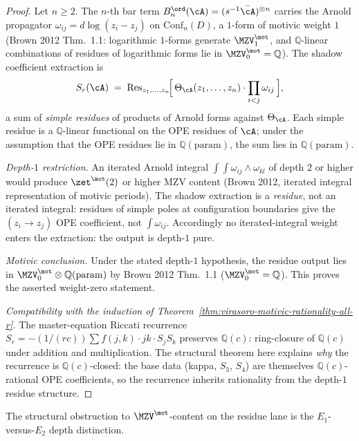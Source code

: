 \begin{proof}
Let $n \geq 2$. The $n$-th bar term
$B_n^{\ord}(\cA) = (s^{-1} \bar{\cA})^{\otimes n}$ carries the Arnold
propagator $\omega_{ij} = d\log(z_i - z_j)$ on $\mathrm{Conf}_n(D)$,
a $1$-form of motivic weight $1$ (Brown 2012 Thm.\ 1.1: logarithmic
$1$-forms generate $\MZV^{\mot}_1$, and $\mathbb{Q}$-linear
combinations of residues of logarithmic forms lie in $\MZV^{\mot}_0 =
\mathbb{Q}$). The shadow coefficient extraction is
\[
 S_r(\cA) \;=\; \operatorname{Res}_{z_1, \ldots, z_n}\!
 \Bigl[\,
 \Theta_{\cA}(z_1, \ldots, z_n) \cdot \prod_{i < j} \omega_{ij}
 \,\Bigr],
\]
a sum of \emph{simple residues} of products of Arnold forms against
$\Theta_{\cA}$. Each simple residue is a $\mathbb{Q}$-linear functional
on the OPE residues of $\cA$; under the assumption that the OPE
residues lie in $\mathbb{Q}(\mathrm{param})$, the sum lies in
$\mathbb{Q}(\mathrm{param})$.

\emph{Depth-$1$ restriction.} An iterated Arnold integral
$\int\!\int \omega_{ij} \wedge \omega_{kl}$ of depth $2$ or higher
would produce $\zet^{\mot}(2)$ or higher MZV content (Brown 2012,
iterated integral representation of motivic periods). The shadow
extraction is a \emph{residue}, not an iterated integral: residues
of simple poles at configuration boundaries give the
$(z_i \to z_j)$ OPE coefficient, not $\int \omega_{ij}$. Accordingly
no iterated-integral weight enters the extraction: the output is
depth-$1$ pure.

\emph{Motivic conclusion.} Under the stated depth-$1$ hypothesis, the
residue output lies in
$\MZV^{\mot}_0 \otimes \mathbb{Q}(\mathrm{param})$ by Brown 2012
Thm.\ 1.1 ($\MZV^{\mot}_0 = \mathbb{Q}$). This proves the asserted
weight-zero statement.

\emph{Compatibility with the induction of
Theorem~\ref{thm:virasoro-motivic-rationality-all-r}.} The
master-equation Riccati recurrence
$S_r = -(1/(r c)) \sum f(j, k) \cdot j k \cdot S_j S_k$ preserves
$\mathbb{Q}(c)$: ring-closure of $\mathbb{Q}(c)$ under addition and
multiplication. The structural theorem here explains \emph{why} the
recurrence is $\mathbb{Q}(c)$-closed: the base data (kappa, $S_3$,
$S_4$) are themselves $\mathbb{Q}(c)$-rational OPE coefficients, so
the recurrence inherits rationality from the depth-$1$ residue
structure.
\end{proof}

The structural obstruction to $\MZV^{\mot}$-content on the residue
lane is the $E_1$-versus-$E_2$ depth distinction.

